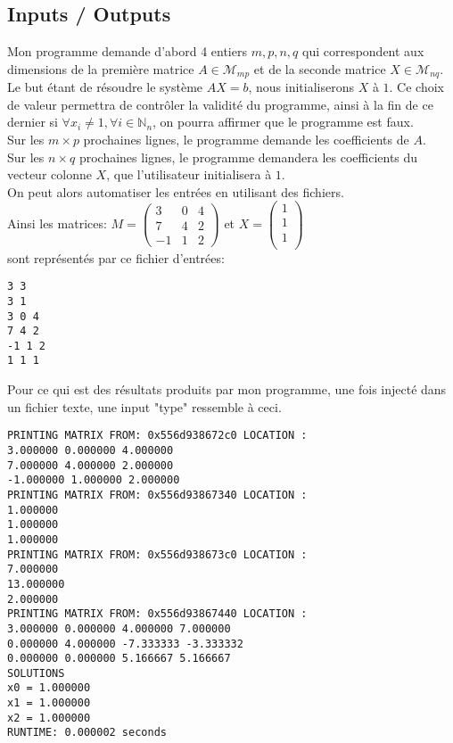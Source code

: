 \subsection{Inputs / Outputs}
Mon programme demande d'abord 4 entiers $m,p,n,q$ qui correspondent aux dimensions de la première matrice $A \in \mathcal{M}_{mp}$ et de la seconde matrice $X \in \mathcal{M}_{nq}$. Le but étant de résoudre le système $AX=b$, nous initialiserons $X$ à $1$. Ce choix de valeur permettra de contrôler la validité du programme, ainsi à la fin de ce dernier si $\forall x_i \neq 1, \forall i \in \mathbb{N}_{n}$, on pourra affirmer que le programme est faux.\vspace{8pt}\\
Sur les $m\times p$ prochaines lignes, le programme demande les coefficients de $A$. \\
Sur les $n \times q$ prochaines lignes, le programme demandera les coefficients du vecteur colonne $X$, que l'utilisateur initialisera à $1$. \\
On peut alors automatiser les entrées en utilisant des fichiers. \\
Ainsi les matrices:
$ M = \begin{pmatrix}
3 & 0 & 4\\
7 & 4 & 2 \\
-1 & 1 & 2
\end{pmatrix}
$
et 
$ X = \begin{pmatrix}
1 \\
1 \\
1 \\
\end{pmatrix}
$\vspace{6pt}\\
sont représentés par ce fichier d'entrées: 
\begin{lstlisting}[caption=input.txt]
3 3
3 1 
3 0 4
7 4 2
-1 1 2
1 1 1
\end{lstlisting}
Pour ce qui est des résultats produits par mon programme, une fois injecté dans un fichier texte, une input "type" ressemble à ceci. \\
\begin{lstlisting}[caption=Gauss elimination with M and X matrix]
PRINTING MATRIX FROM: 0x556d938672c0 LOCATION :
3.000000 0.000000 4.000000
7.000000 4.000000 2.000000
-1.000000 1.000000 2.000000
PRINTING MATRIX FROM: 0x556d93867340 LOCATION :
1.000000
1.000000
1.000000
PRINTING MATRIX FROM: 0x556d938673c0 LOCATION :
7.000000
13.000000
2.000000
PRINTING MATRIX FROM: 0x556d93867440 LOCATION :
3.000000 0.000000 4.000000 7.000000
0.000000 4.000000 -7.333333 -3.333332
0.000000 0.000000 5.166667 5.166667
SOLUTIONS
x0 = 1.000000
x1 = 1.000000
x2 = 1.000000
RUNTIME: 0.000002 seconds 
\end{lstlisting}
